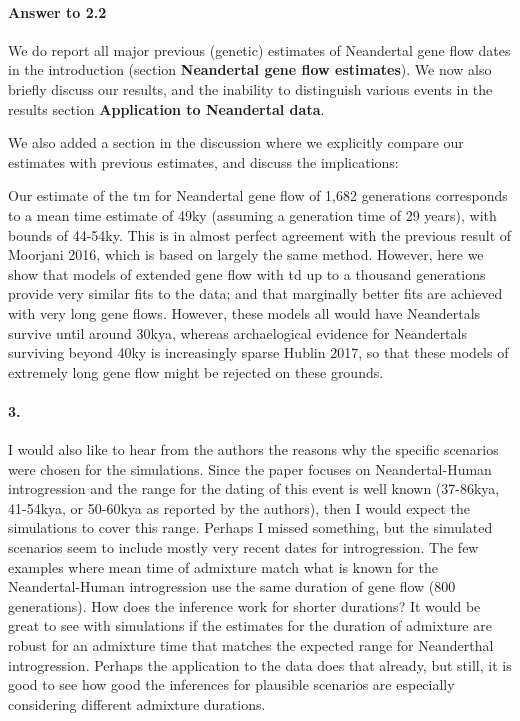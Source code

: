 \documentclass[11pt]{article}
\let\oldparagraph\paragraph
\renewcommand{\paragraph}[1]{\oldparagraph{#1}\mbox{}}
\begin{document}
\paragraph{Answer to 2.2}
We do report all major previous (genetic) estimates of Neandertal gene flow dates in the introduction (section \textbf{Neandertal gene flow estimates}). We now also briefly discuss our results, and the inability to distinguish various events in the results section \textbf{Application to Neandertal data}.

We also added a section in the discussion where we explicitly compare our estimates with previous estimates, and discuss the implications:

\begin{mdframed}[hidealllines=true,backgroundcolor=grey!20]
Our estimate of the tm for Neandertal gene flow of 1,682 generations corresponds to a mean time estimate of 49ky (assuming a generation time of 29 years), with bounds of 44-54ky. This is in almost perfect agreement with the previous result of Moorjani 2016, which is based on largely the same method. However, here we show that models of extended gene flow with td up to a thousand generations provide very similar fits to the data; and that marginally better fits are achieved with very long gene flows. However, these models all would have Neandertals survive until around 30kya, whereas archaelogical evidence for Neandertals surviving beyond 40ky is increasingly sparse Hublin 2017, so that these models of extremely long gene flow might be rejected on these grounds.\end{mdframed}

\paragraph{3.}
I would also like to hear from the authors the reasons why the specific scenarios were chosen for the simulations. Since the paper focuses on Neandertal-Human introgression and the range for the dating of this event is well known (37-86kya, 41-54kya, or 50-60kya as reported by the authors), then I would expect the simulations to cover this range. Perhaps I missed something, but the simulated scenarios seem to include mostly very recent dates for introgression. The few examples where mean time of admixture match what is known for the Neandertal-Human introgression use the same duration of gene flow (800 generations). How does the inference work for shorter durations? It would be great to see with simulations if the estimates for the duration of admixture are robust for an admixture time that matches the expected range for Neanderthal introgression. Perhaps the application to the data does that already, but still, it is good to see how good the inferences for plausible scenarios are especially considering different admixture durations.
\end{document}
